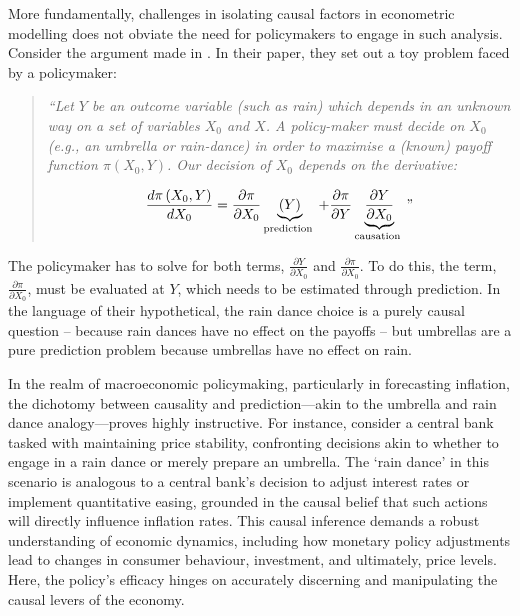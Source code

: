 More fundamentally, challenges in isolating causal factors in econometric modelling does not obviate the need for policymakers to engage in such analysis. Consider the argument made in \textcite{Kleinberg2015PredictionProblems}. In their paper, they set out a toy problem faced by a policymaker:

\begin{quote}
    \textit{``Let $Y$ be an outcome variable (such as rain) which depends in an unknown way on a set of variables $X_0$ and $X$. A policy-maker must decide on $X_0$ (e.g., an umbrella or rain-dance) in order to maximise a (known) payoff function $\pi\left(X_0, Y\right)$. Our decision of $X_0$ depends on the derivative:}

    $$
    \frac{d \pi\left(X_0, Y\right)}{d X_0}=\frac{\partial \pi}{\partial X_0} \underbrace{(Y)}_{\text {prediction }}+\frac{\partial \pi}{\partial Y} \underbrace{\frac{\partial Y}{\partial X_0}}_{\text {causation }}"
    $$
\end{quote}

The policymaker has to solve for both terms, $\frac{\partial Y}{\partial X_0}$ and $\frac{\partial \pi}{\partial X_0}$. To do this, the term, $\frac{\partial \pi}{\partial X_0}$, must be evaluated at $Y$, which needs to be estimated through prediction. In the language of their hypothetical, the rain dance choice is a purely causal question -- because rain dances have no effect on the payoffs -- but umbrellas are a pure prediction problem because umbrellas have no effect on rain. 

In the realm of macroeconomic policymaking, particularly in forecasting inflation, the dichotomy between causality and prediction—akin to the umbrella and rain dance analogy—proves highly instructive. For instance, consider a central bank tasked with maintaining price stability, confronting decisions akin to whether to engage in a rain dance or merely prepare an umbrella. The `rain dance' in this scenario is analogous to a central bank's decision to adjust interest rates or implement quantitative easing, grounded in the causal belief that such actions will directly influence inflation rates. This causal inference demands a robust understanding of economic dynamics, including how monetary policy adjustments lead to changes in consumer behaviour, investment, and ultimately, price levels. Here, the policy's efficacy hinges on accurately discerning and manipulating the causal levers of the economy.

